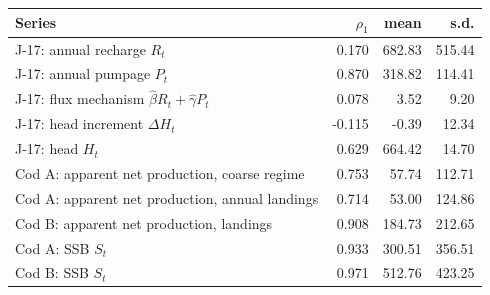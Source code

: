 \begin{tabular}{@{}lrrr@{}}
\toprule
Series & $\rho_1$ & mean & s.d. \\
\midrule
J-17: annual recharge $R_t$ & 0.170 & 682.83 & 515.44 \\
J-17: annual pumpage $P_t$ & 0.870 & 318.82 & 114.41 \\
J-17: flux mechanism $\hat\beta R_t+\hat\gamma P_t$ & 0.078 & 3.52 & 9.20 \\
J-17: head increment $\Delta H_t$ & -0.115 & -0.39 & 12.34 \\
J-17: head $H_t$ & 0.629 & 664.42 & 14.70 \\
Cod A: apparent net production, coarse regime & 0.753 & 57.74 & 112.71 \\
Cod A: apparent net production, annual landings & 0.714 & 53.00 & 124.86 \\
Cod B: apparent net production, landings & 0.908 & 184.73 & 212.65 \\
Cod A: SSB $S_t$ & 0.933 & 300.51 & 356.51 \\
Cod B: SSB $S_t$ & 0.971 & 512.76 & 423.25 \\
\bottomrule
\end{tabular}
